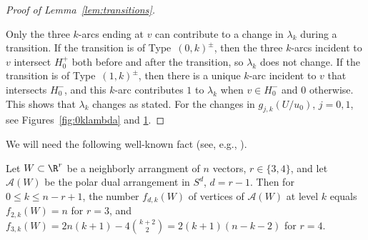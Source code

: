 \begin{proof}[Proof of Lemma~\ref{lem:transitions}]
\begin{figure}[ht]
\label{fig:1klambda}
\end{figure}
%
Only the three $k$-arcs ending at $v$ can contribute to a change in $\lambda_k$ during a transition. If the transition is of Type~$(0,k)^{\pm}$, then the three $k$-arcs incident to $v$ intersect $H_0^+$ both before and after the transition, so $\lambda_k$ does not change. If the transition is of Type~$(1,k)^{\pm}$, then there is a unique $k$-arc incident to $v$ that intersects $H_0^-$, and this $k$-arc contributes $1$ to $\lambda_k$ when $v\in H_0^-$ and $0$ otherwise. This shows that $\lambda_k$ changes as stated. 
%
For the changes in $g_{j,k}(U/u_0)$, $j=0,1$, see Figures~\ref{fig:0klambda} and \ref{fig:1klambda}.\end{proof}
We will need the following well-known fact (see, e.g., \cite[Corollary~8]{Welzl:2001aa}).
\begin{lemma} 
\label{lem:k-facets-neighborly}
Let $W\subset \R^r$ be a neighborly arrangment of $n$ vectors, $r\in \{3,4\}$, and let $\mathcal{A}(W)$ be the polar dual arrangement in $S^d$, $d=r-1$. Then for $0\leq k\leq n-r+1$, the number $f_{d,k}(W)$ of vertices of $\mathcal{A}(W)$ at level $k$ equals $f_{2,k}(W)=n$ for $r=3$, and $f_{3,k}(W)=2n(k+1)-4\binom{k+2}{2}=2(k+1)(n-k-2)$ for $r=4$.
\end{lemma}
%
%
%
%
%
